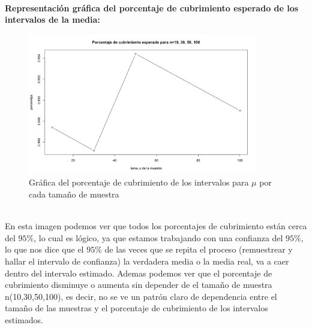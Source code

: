 \documentclass[letterpaper,12pt,onecolumn,titlepage]{article}
\begin{document}
~\\\textbf{Representaci\'{o}n gr\'{a}fica del porcentaje de cubrimiento esperado de los intervalos de la media:}
~\\ \begin{figure}[!h]
    \begin{center}
        \includegraphics[width=10cm]{Figuras/Pa1.png}
        \caption{Gr\'{a}fica del porcentaje de cubrimiento de los intervalos para $\mu$ por cada tama\~{n}o de muestra}
        \label{fig:Densidad}
    \end{center}
\end{figure}
~\\ En esta imagen podemos ver que todos los porcentajes de cubrimiento est\'{a}n cerca del $95\%$, lo cual es l\'{o}gico, ya que estamos trabajando con una confianza del $95\%$, lo que nos dice que el $95\%$ de las veces que se repita el proceso (remuestrear y hallar el intervalo de confianza) la verdadera media o la media real, va a caer dentro del intervalo estimado. Ademas podemos ver que el porcentaje de cubrimiento disminuye o aumenta sin depender de el tama\~{n}o de muestra n(10,30,50,100), es decir, no se ve un patr\'{o}n claro de dependencia entre el tama\~{n}o de las muestras y el porcentaje de cubrimiento de los intervalos estimados.
\end{document}
